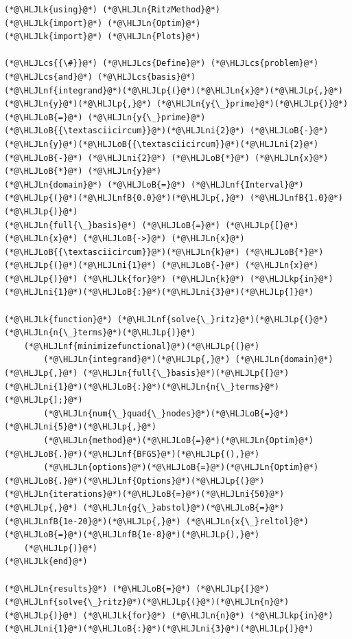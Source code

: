 \documentclass[12pt,a4paper]{article}
\newcommand{\HLJLk}[1]{\textcolor[RGB]{148,91,176}{\textbf{#1}}}
\newcommand{\HLJLkp}[1]{\textcolor[RGB]{148,91,176}{\textbf{#1}}}
\newcommand{\HLJLn}[1]{#1}
\newcommand{\HLJLnf}[1]{\textcolor[RGB]{66,102,213}{#1}}
\newcommand{\HLJLnfB}[1]{\textcolor[RGB]{59,151,46}{#1}}
\newcommand{\HLJLni}[1]{\textcolor[RGB]{59,151,46}{#1}}
\newcommand{\HLJLoB}[1]{\textcolor[RGB]{102,102,102}{\textbf{#1}}}
\newcommand{\HLJLp}[1]{#1}
\newcommand{\HLJLcs}[1]{\textcolor[RGB]{153,153,119}{\textit{#1}}}
\begin{document}
\begin{lstlisting}
(*@\HLJLk{using}@*) (*@\HLJLn{RitzMethod}@*)
(*@\HLJLk{import}@*) (*@\HLJLn{Optim}@*)
(*@\HLJLk{import}@*) (*@\HLJLn{Plots}@*)

(*@\HLJLcs{{\#}}@*) (*@\HLJLcs{Define}@*) (*@\HLJLcs{problem}@*) (*@\HLJLcs{and}@*) (*@\HLJLcs{basis}@*)
(*@\HLJLnf{integrand}@*)(*@\HLJLp{(}@*)(*@\HLJLn{x}@*)(*@\HLJLp{,}@*) (*@\HLJLn{y}@*)(*@\HLJLp{,}@*) (*@\HLJLn{y{\_}prime}@*)(*@\HLJLp{)}@*) (*@\HLJLoB{=}@*) (*@\HLJLn{y{\_}prime}@*)(*@\HLJLoB{{\textasciicircum}}@*)(*@\HLJLni{2}@*) (*@\HLJLoB{-}@*) (*@\HLJLn{y}@*)(*@\HLJLoB{{\textasciicircum}}@*)(*@\HLJLni{2}@*) (*@\HLJLoB{-}@*) (*@\HLJLni{2}@*) (*@\HLJLoB{*}@*) (*@\HLJLn{x}@*) (*@\HLJLoB{*}@*) (*@\HLJLn{y}@*)
(*@\HLJLn{domain}@*) (*@\HLJLoB{=}@*) (*@\HLJLnf{Interval}@*)(*@\HLJLp{(}@*)(*@\HLJLnfB{0.0}@*)(*@\HLJLp{,}@*) (*@\HLJLnfB{1.0}@*)(*@\HLJLp{)}@*)
(*@\HLJLn{full{\_}basis}@*) (*@\HLJLoB{=}@*) (*@\HLJLp{[}@*)(*@\HLJLn{x}@*) (*@\HLJLoB{->}@*) (*@\HLJLn{x}@*)(*@\HLJLoB{{\textasciicircum}}@*)(*@\HLJLn{k}@*) (*@\HLJLoB{*}@*) (*@\HLJLp{(}@*)(*@\HLJLni{1}@*) (*@\HLJLoB{-}@*) (*@\HLJLn{x}@*)(*@\HLJLp{)}@*) (*@\HLJLk{for}@*) (*@\HLJLn{k}@*) (*@\HLJLkp{in}@*) (*@\HLJLni{1}@*)(*@\HLJLoB{:}@*)(*@\HLJLni{3}@*)(*@\HLJLp{]}@*)

(*@\HLJLk{function}@*) (*@\HLJLnf{solve{\_}ritz}@*)(*@\HLJLp{(}@*)(*@\HLJLn{n{\_}terms}@*)(*@\HLJLp{)}@*)
    (*@\HLJLnf{minimizefunctional}@*)(*@\HLJLp{(}@*)
        (*@\HLJLn{integrand}@*)(*@\HLJLp{,}@*) (*@\HLJLn{domain}@*)(*@\HLJLp{,}@*) (*@\HLJLn{full{\_}basis}@*)(*@\HLJLp{[}@*)(*@\HLJLni{1}@*)(*@\HLJLoB{:}@*)(*@\HLJLn{n{\_}terms}@*)(*@\HLJLp{];}@*)
        (*@\HLJLn{num{\_}quad{\_}nodes}@*)(*@\HLJLoB{=}@*)(*@\HLJLni{5}@*)(*@\HLJLp{,}@*)
        (*@\HLJLn{method}@*)(*@\HLJLoB{=}@*)(*@\HLJLn{Optim}@*)(*@\HLJLoB{.}@*)(*@\HLJLnf{BFGS}@*)(*@\HLJLp{(),}@*)
        (*@\HLJLn{options}@*)(*@\HLJLoB{=}@*)(*@\HLJLn{Optim}@*)(*@\HLJLoB{.}@*)(*@\HLJLnf{Options}@*)(*@\HLJLp{(}@*)(*@\HLJLn{iterations}@*)(*@\HLJLoB{=}@*)(*@\HLJLni{50}@*)(*@\HLJLp{,}@*) (*@\HLJLn{g{\_}abstol}@*)(*@\HLJLoB{=}@*)(*@\HLJLnfB{1e-20}@*)(*@\HLJLp{,}@*) (*@\HLJLn{x{\_}reltol}@*)(*@\HLJLoB{=}@*)(*@\HLJLnfB{1e-8}@*)(*@\HLJLp{),}@*)
    (*@\HLJLp{)}@*)
(*@\HLJLk{end}@*)

(*@\HLJLn{results}@*) (*@\HLJLoB{=}@*) (*@\HLJLp{[}@*)(*@\HLJLnf{solve{\_}ritz}@*)(*@\HLJLp{(}@*)(*@\HLJLn{n}@*)(*@\HLJLp{)}@*) (*@\HLJLk{for}@*) (*@\HLJLn{n}@*) (*@\HLJLkp{in}@*) (*@\HLJLni{1}@*)(*@\HLJLoB{:}@*)(*@\HLJLni{3}@*)(*@\HLJLp{]}@*)
\end{lstlisting}
\end{document}
